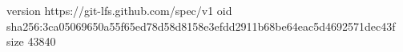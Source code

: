 version https://git-lfs.github.com/spec/v1
oid sha256:3ca05069650a55f65ed78d58d8158e3efdd2911b68be64eac5d4692571dec43f
size 43840
